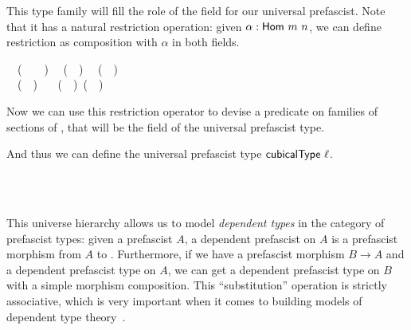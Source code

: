 
This type family will fill the role of the field  for our universal 
prefascist.
% 
Note that it has a natural restriction operation: given \( \alpha : \func{Hom}~m~n \), 
we can define restriction as composition with \( \alpha \) in both fields.
% 
% 
\begin{code}
\>[0]~\AgdaSymbol{:}~(~\AgdaSymbol{:}~~~)~%
~(~~)~%
~(~~)\<%
\\
\>[0]~~(~~)~%
\AgdaSymbol{=}~~(~~)~(~~)\<%
\end{code}

Now we can use this restriction operator to devise a predicate  
on families of sections of , that will be the field  of the 
universal prefascist type.


And thus we can define the universal prefascist type \( \func{cubicalType}~\ell \).
% 
\begin{code}
\>[0]~\AgdaSymbol{:}~~~~\<%
\\
\>[0]~\AgdaBound{\ell}~%
\AgdaSymbol{=}~\AgdaSymbol{\{}~~\AgdaSymbol{=}~~~\AgdaSymbol{;}~%
~\AgdaSymbol{=}~~\AgdaSymbol{\}}\<%
\end{code}

This universe hierarchy allows us to model \emph{dependent types} in the 
category of prefascist types: given a prefascist \( A \), a dependent prefascist
on \( A \) is a prefascist morphism from \( A \) to .
% 
Furthermore, if we have a prefascist morphism \( B \to A \) and a dependent prefascist type
on \( A \), we can get a dependent prefascist type on \( B \) with a simple 
morphism composition.
% 
This ``substitution'' operation is strictly associative, which is very important when it
comes to building models of dependent type theory~.

